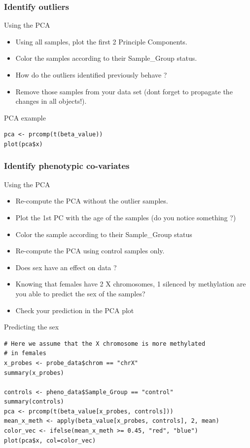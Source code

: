 \documentclass[10pt]{beamer}
\newenvironment{xframe}[2][]
  {\begin{frame}[fragile,environment=xframe,#1]
  \frametitle{#2}}
  {\end{frame}}
\begin{document}
\begin{xframe}{Identify outliers}
  \begin{block}{Using the PCA}
    \begin{itemize}
      \item Using all samples, plot the first 2 Principle Components.
      \item Color the samples according to their Sample_Group status. 
      \item How do the outliers identified previously behave ?
      \item Remove those samples from your data set (dont forget to propagate
      the changes in all objects!).
    \end{itemize}
  \end{block}
   \begin{exampleblock}{PCA example}
\begin{verbatim}
pca <- prcomp(t(beta_value))
plot(pca$x)
\end{verbatim}  
  \end{exampleblock}
\end{xframe}


\begin{xframe}{Identify phenotypic co-variates}
  \begin{block}{Using the PCA}
    \begin{itemize}
      \item Re-compute the PCA without the outlier samples.
      \item Plot the 1st PC with the age of the samples (do you notice
      something ?)
      \item Color the sample according to their Sample_Group status
      \item Re-compute the PCA using {\sf control} samples only.
	  \item Does sex have an effect on data ?
	  \item Knowing that females have 2 X chromosomes, 1 silenced by methylation
	  are you able to predict the sex of the samples?
	  \item Check your prediction in the PCA plot
    \end{itemize}
    \begin{exampleblock}{Predicting the sex}
\begin{verbatim}
# Here we assume that the X chromosome is more methylated
# in females
x_probes <- probe_data$chrom == "chrX"
summary(x_probes)

controls <- pheno_data$Sample_Group == "control"
summary(controls)
pca <- prcomp(t(beta_value[x_probes, controls]))
mean_x_meth <- apply(beta_value[x_probes, controls], 2, mean)
color_vec <- ifelse(mean_x_meth >= 0.45, "red", "blue")
plot(pca$x, col=color_vec)
\end{verbatim}  
  \end{exampleblock}   
  \end{block}
\end{xframe}
\end{document}
